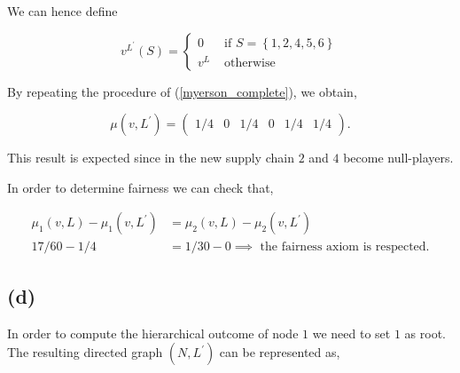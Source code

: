 \documentclass[american]{scrartcl}
\newcommand{\set}[1]{\left\{#1\right\}}
\begin{document}
We can hence define

\begin{equation} \label{restr_v}
    v^{L^\prime}(S) = \begin{cases}
        0   & \text{ if } S = \set{1, 2, 4, 5, 6} \\
        v^L & \text{ otherwise }
    \end{cases}
\end{equation}

By repeating the procedure of (\ref{myerson_complete}), we obtain,

\begin{equation}
    \mu(v, L^\prime) = \begin{pmatrix}
        1/4 & 0 & 1/4 & 0 & 1/4 & 1/4
    \end{pmatrix}.
\end{equation}

This result is expected since in the new supply chain $2$ and $4$ become null-players.

In order to determine fairness we can check that,

\begin{equation}
    \begin{split}
        \mu_1(v, L) - \mu_1(v, L^\prime) &= \mu_2(v, L) - \mu_2(v, L^\prime) \\
        17/60 - 1 / 4 &= 1/30 - 0 \implies \text{ the fairness axiom is respected.}
    \end{split}
\end{equation}

\subsection*{(d)}

In order to compute the hierarchical outcome of node $1$ we need to set $1$ as root. The resulting directed graph $(N, L^\prime)$ can be represented as,


\vspace{1cm}
\begin{center}
\end{center}
\end{document}
